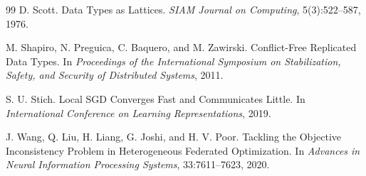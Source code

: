 \documentclass[11pt]{article}
\theoremstyle{definition}
\theoremstyle{remark}
\begin{document}
\begin{thebibliography}{99}
D. Scott.
\newblock Data Types as Lattices.
\newblock \emph{SIAM Journal on Computing}, 5(3):522--587, 1976.

M. Shapiro, N. Preguica, C. Baquero, and M. Zawirski.
\newblock Conflict-Free Replicated Data Types.
\newblock In \emph{Proceedings of the International Symposium on Stabilization, Safety, and Security of Distributed Systems}, 2011.

S. U. Stich.
\newblock Local SGD Converges Fast and Communicates Little.
\newblock In \emph{International Conference on Learning Representations}, 2019.

J. Wang, Q. Liu, H. Liang, G. Joshi, and H. V. Poor.
\newblock Tackling the Objective Inconsistency Problem in Heterogeneous Federated Optimization.
\newblock In \emph{Advances in Neural Information Processing Systems}, 33:7611--7623, 2020.

\end{thebibliography}
\end{document}

